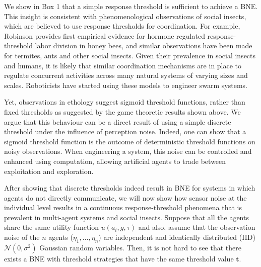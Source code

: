 \documentclass{nature}
\def\td{\mathbf{t}}   %
\begin{document}
\linenumbers
We show in Box 1 that a simple response threshold is sufficient to achieve a BNE. This insight is consistent with phenomenological observations of social insects, which are believed to use response thresholds for coordination. For example, Robinson\cite{Robinson1987} provides first empirical evidence for hormone regulated response-threshold labor division in honey bees, and similar observations have been made for termites, ants and other social insects\cite{Bonabeau1999,Camazine2001}. Given their prevalence in social insects and humans, it is likely that similar coordination mechanisms are in place to regulate concurrent activities across many natural systems of varying sizes and scales.
%
%
Roboticists have started using these models to engineer swarm systems\cite{Bonabeau1996,Theraulaz1998,Krieger2000}. %

Yet, observations in ethology suggest sigmoid threshold functions\cite{Bonabeau1996}, rather than fixed thresholds as suggested by the game theoretic results shown above. We argue that this behaviour can be a direct result of using a simple discrete threshold under the influence of perception noise. Indeed, one can show that a sigmoid threshold function is the outcome of deterministic threshold functions on noisy observations. When engineering a system, this noise can be controlled and enhanced using computation, allowing artificial agents to trade between exploitation and exploration. 

After showing that discrete thresholds indeed result in BNE for systems in which agents do not directly communicate, we will now show how sensor noise at the individual level results in a continuous response-threshold phenomena that is prevalent in multi-agent systems and social insects. Suppose that all the agents share the same utility function $u(a_i,g,\tau)$ and also, assume that the observation noise of the $n$ agents ($\eta_1,\ldots,\eta_n$) are independent and identically distributed (IID) $\mathcal{N}(0,\sigma^2)$ Gaussian random variables. Then, it is not hard to see that there exists a BNE with threshold strategies that have the same threshold value $\td$\cite{Morris2000}.
\end{document}
